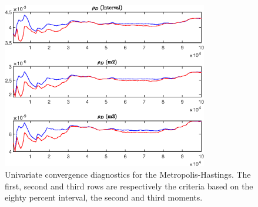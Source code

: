 \begin{figure}[H]
\centering 
\includegraphics[width=0.80\textwidth]{BRS_growth_KPR_D/Output/BRS_growth_KPR_D_udiag3}
\caption{Univariate convergence diagnostics for the Metropolis-Hastings.
The first, second and third rows are respectively the criteria based on
the eighty percent interval, the second and third moments.}\label{Fig:UnivariateDiagnostics:3}
\end{figure}

